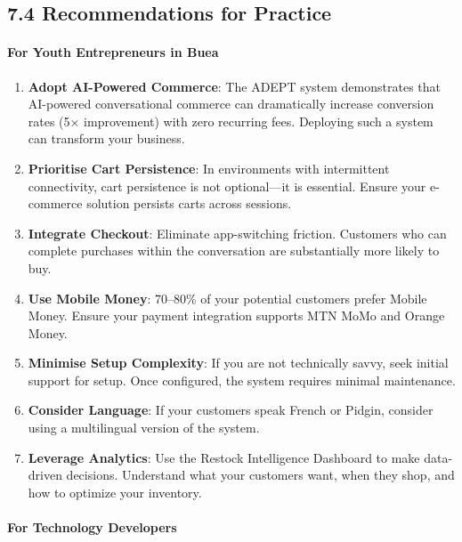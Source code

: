 \documentclass[12pt,a4paper]{article}
\begin{document}
\subsection{7.4 Recommendations for Practice}

\paragraph{For Youth Entrepreneurs in Buea}

\begin{enumerate}
    \item \textbf{Adopt AI-Powered Commerce}: The ADEPT system demonstrates that AI-powered conversational commerce can dramatically increase conversion rates (5× improvement) with zero recurring fees. Deploying such a system can transform your business.
    \item \textbf{Prioritise Cart Persistence}: In environments with intermittent connectivity, cart persistence is not optional---it is essential. Ensure your e-commerce solution persists carts across sessions.
    \item \textbf{Integrate Checkout}: Eliminate app-switching friction. Customers who can complete purchases within the conversation are substantially more likely to buy.
    \item \textbf{Use Mobile Money}: 70--80\% of your potential customers prefer Mobile Money. Ensure your payment integration supports MTN MoMo and Orange Money.
    \item \textbf{Minimise Setup Complexity}: If you are not technically savvy, seek initial support for setup. Once configured, the system requires minimal maintenance.
    \item \textbf{Consider Language}: If your customers speak French or Pidgin, consider using a multilingual version of the system.
    \item \textbf{Leverage Analytics}: Use the Restock Intelligence Dashboard to make data-driven decisions. Understand what your customers want, when they shop, and how to optimize your inventory.
\end{enumerate}

\paragraph{For Technology Developers}
\end{document}
